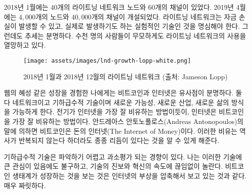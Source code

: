 \begin{comment}
In January 2018, the lightning network had $40$ nodes and $60$
channels~\cite{web:lightning-nodes}. In April 2019, the network grew to more
than $4000$ nodes and around $40.000$ channels. Keep in mind that this is still
experimental technology where loss of funds can and does occur. Yet the trend is
clear: thousands of people are reckless and eager to use it.
\end{comment}
2018년 1월에는 $40$개의 라이트닝 네트워크 노드와 $60$개의 채널이 있었다\cite{web:lightning-nodes}.
2019년 4월에는 $4,000$개의 노드와  $40,000$개의 채널이 개설되었다.
라이트닝 네트워크는 자금 손실이 발생할 수 있고, 실제로 발생하기도 하는 실험적인 기술인 것을 명심해야 한다.
그런데도 추세는 분명하다. 
수천 명의 사람들이 무모하게도 라이트닝 네트워크의 사용을 열망하고 있다.

\begin{figure}
  \texttt{[image: assets/images/lnd-growth-lopp-white.png]}
  \caption{2018년 1월과 2018년 12월의 라이트닝 네트워크 (출처: Jameson Lopp)}
  \label{fig:lnd-growth-lopp-white.png}
\end{figure}

\begin{comment}
To me, having lived through the meteoric rise of the web, the parallels
between the internet and Bitcoin are obvious. Both are networks, both
are exponential technologies, and both enable new possibilities, new
industries, new ways of life. Just like electricity was the best
metaphor to understand where the internet is heading, the internet might
be the best metaphor to understand where bitcoin is heading. Or, in the
words of Andreas Antonopoulos, Bitcoin is \textit{The Internet of Money}.
These metaphors are a great reminder that while history doesn't repeat
itself, it often rhymes.
\end{comment}
웹의 혜성 같은 성장을 경험한 나에게는 비트코인과 인터넷은 유사점이 분명하다.
둘 다 네트워크이고 기하급수적 기술이며 새로운 가능성, 새로운 산업, 새로운 삶의 방식을 가능하게 한다.
전기가 인터넷을 가장 잘 비유하는 방법이듯이, 인터넷은 비트코인을 가장 잘 비유하는 방법이다.
안드레아스 안토노풀로스(Andreas Antonopoulos)의 말에 의하면 비트코인은 돈의 인터넷(The Internet of Money)이다.
이러한 비유는 역사가 반복되지 않는다 하더라도 종종 리듬이 있다는 것을 알 수 있게 해준다.

\begin{comment}
Exponential technologies are hard to grasp and often underestimated.
Even though I have a great interest in such technologies, I am
constantly surprised by the pace of progress and innovation. Watching
the Bitcoin ecosystem grow is like watching the rise of the internet in
fast-forward. It is exhilarating.
\end{comment}
기하급수적 기술은 파악하기 어렵고 과소평가 되는 경향이 있다.
나는 이러한 기술에 큰 관심이 있음에도 불구하고, 기술의 진보와 혁신의 속도에 끊임없이 놀란다.
비트코인 생태계가 성장하는 것을 보는 것은 인터넷의 부상을 압축해서 보고 있는 것과 같다.
매우 짜릿하다.

